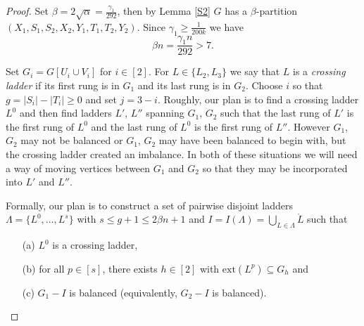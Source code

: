 \documentclass[oneside,12pt]{memoir}
\newcommand{\g}{\gamma}
\begin{document}
\begin{proof}
Set $\beta=2\sqrt{\alpha}=\frac{\g_1}{292}$, then by Lemma \ref{S2} $G$ has a $\beta$-partition $(X_{1},S_{1}, S_{2}, X_{2},Y_{1}, T_{1}, T_{2}, Y_{2})$.  Since $\g_1\geq \frac{1}{200k}$ we have
\begin{equation} 
\beta n=\frac{\g_1 n}{292} >7. \label{beta}
\end{equation}

Set $G_i=G[U_i \cup V_i]$ for $i \in [2] $. For $L\in\{L_2,L_3\}$ we say that $L$ is a \emph{crossing ladder} if its first rung is in $G_{1}$ and its last rung is in $G_{2}$. Choose $i$ so that $g=|S_i|-|T_i| \ge 0$ and set $j=3-i$.  Roughly, our plan is to find a crossing ladder $L^0$ and then find ladders $L'$, $L''$ spanning $G_1$, $G_2$ such that the last rung of $L'$ is the first rung of $L^0$ and the last rung of $L^0$ is the first rung of $L''$.  However $G_1$, $G_2$ may not be balanced or $G_1$, $G_2$ may have been balanced to begin with, but the crossing ladder created an imbalance.  In both of these situations we will need a way of moving vertices between $G_1$ and $G_2$ so that they may be incorporated into $L'$ and $L''$.


Formally, our plan is to construct a set of pairwise disjoint ladders $\Lambda=\{L^0, \dots, L^{s}\}$ with $s\le g+1\le2\beta n+1$ and $I=I(\Lambda)=\bigcup_{L\in\Lambda}\mathring{L}$ such that 
\begin{enumerate}
\item[(a)] $L^0$ is a crossing ladder,

\item[(b)] for all $p\in [s]$, there exists $h\in [2]$ with $ \mathrm{ext}( L^p)\subseteq G_h$ and 

\item[(c)] $G_1 -I$  is balanced (equivalently, $G_2-I$ is balanced). 
\end{enumerate}


\end{proof}
\end{document}
